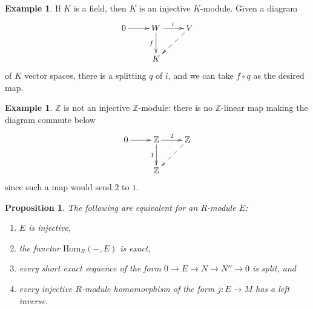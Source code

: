 \documentclass{amsart}[12pt]
\newcommand{\Hom}{\mathrm{Hom}}
\newcommand{\id}{\mathrm{id}}
\newcommand{\Z}{\mathbb{Z}}
\numberwithin{equation}{section}
\theoremstyle{plain} %
\newtheorem{prop}[equation]{Proposition}
\theoremstyle{definition}
\newtheorem{ex}[equation]{Example}
\theoremstyle{remark}
\begin{document}
\begin{ex} If $K$ is a field, then $K$ is an injective $K$-module. Given a diagram
$$
\xymatrix{
0 \ar[r] & W \ar[d]_-f \ar[r]^i & V \ar@{-->}[dl] \\ 
& K \\
}
$$
of $K$ vector spaces, there is a splitting $q$ of $i$, and we can take $f\circ q$ as the desired map.
\end{ex}

\begin{ex}
$\Z$ is not an injective $\Z$-module: there is no $\Z$-linear map making the diagram commute below
$$
\xymatrix{
0 \ar[r] & \Z \ar[d]_-1 \ar[r]^2 & \Z \ar@{-->}[dl] \\ 
& \Z \\
}
$$
since such a map would send $2$ to $1$.
\end{ex}



\begin{prop}
\label{prop:injective}
 The following are equivalent for an $R$-module $E$:
\begin{enumerate}
\item $E$ is injective,
\item the functor $\Hom_R(-, E)$ is exact, 
\item every short exact sequence of the form $0 \to E \to N \to N'' \to 0$ is split, and
\item every injective $R$-module homomorphism of the form $j: E \to M$ has a left inverse.
\end{enumerate}
\end{prop}
\end{document}
